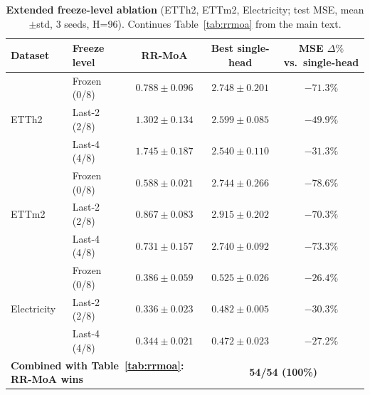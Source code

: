 \documentclass{article}
\begin{document}
\begin{table}[!htbp]
\centering
\caption{\textbf{Extended freeze-level ablation} (ETTh2, ETTm2, Electricity; test MSE, mean$\pm$std, 3 seeds, H=96). Continues Table~\ref{tab:rrmoa} from the main text.}
\label{tab:rrmoa_extended}
\small
\begin{tabular}{@{}llccc@{}}
\toprule
Dataset & Freeze level & RR-MoA & Best single-head & MSE $\Delta\%$ vs.\ single-head \\
\midrule
\multirow{3}{*}{ETTh2}
 & Frozen (0/8)   & $\mathbf{0.788 \pm 0.096}$ & $2.748 \pm 0.201$ & $\mathbf{-71.3\%}$ \\
 & Last-2 (2/8)   & $\mathbf{1.302 \pm 0.134}$ & $2.599 \pm 0.085$ & $-49.9\%$ \\
 & Last-4 (4/8)   & $\mathbf{1.745 \pm 0.187}$ & $2.540 \pm 0.110$ & $-31.3\%$ \\
\midrule
\multirow{3}{*}{ETTm2}
 & Frozen (0/8)   & $\mathbf{0.588 \pm 0.021}$ & $2.744 \pm 0.266$ & $\mathbf{-78.6\%}$ \\
 & Last-2 (2/8)   & $\mathbf{0.867 \pm 0.083}$ & $2.915 \pm 0.202$ & $-70.3\%$ \\
 & Last-4 (4/8)   & $\mathbf{0.731 \pm 0.157}$ & $2.740 \pm 0.092$ & $-73.3\%$ \\
\midrule
\multirow{3}{*}{Electricity}
 & Frozen (0/8)   & $\mathbf{0.386 \pm 0.059}$ & $0.525 \pm 0.026$ & $-26.4\%$ \\
 & Last-2 (2/8)   & $\mathbf{0.336 \pm 0.023}$ & $0.482 \pm 0.005$ & $\mathbf{-30.3\%}$ \\
 & Last-4 (4/8)   & $\mathbf{0.344 \pm 0.021}$ & $0.472 \pm 0.023$ & $-27.2\%$ \\
\midrule
\multicolumn{3}{l}{\textbf{Combined with Table~\ref{tab:rrmoa}: RR-MoA wins}} & \multicolumn{2}{c}{\textbf{54/54 (100\%)}} \\
\bottomrule
\end{tabular}
\end{table}
\end{document}
